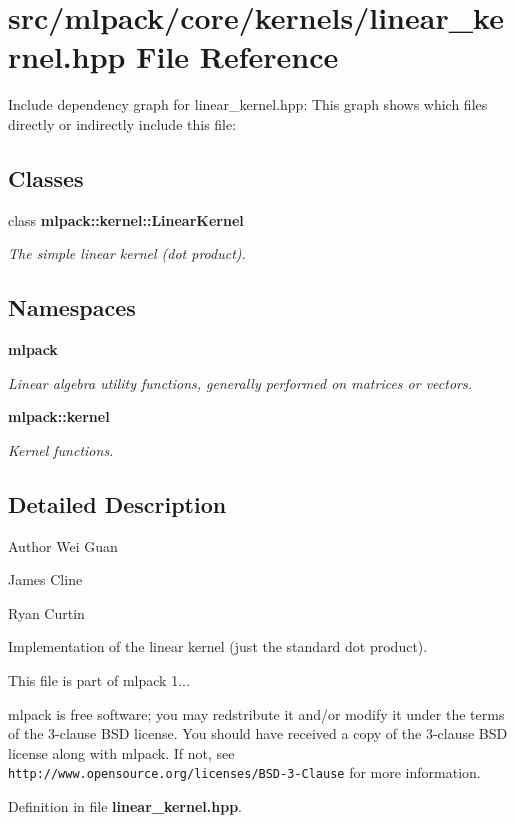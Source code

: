 \section{src/mlpack/core/kernels/linear\-\_\-kernel.hpp File Reference}
\label{linear__kernel_8hpp}
Include dependency graph for linear\-\_\-kernel.\-hpp\-:
This graph shows which files directly or indirectly include this file\-:
\subsection*{Classes}
\begin{DoxyCompactItemize}
\item 
class {\bf mlpack\-::kernel\-::\-Linear\-Kernel}
\begin{DoxyCompactList}\small\item\em The simple linear kernel (dot product). \end{DoxyCompactList}\end{DoxyCompactItemize}
\subsection*{Namespaces}
\begin{DoxyCompactItemize}
\item 
{\bf mlpack}
\begin{DoxyCompactList}\small\item\em Linear algebra utility functions, generally performed on matrices or vectors. \end{DoxyCompactList}\item 
{\bf mlpack\-::kernel}
\begin{DoxyCompactList}\small\item\em Kernel functions. \end{DoxyCompactList}\end{DoxyCompactItemize}


\subsection{Detailed Description}
\begin{DoxyAuthor}{Author}
Wei Guan 

James Cline 

Ryan Curtin
\end{DoxyAuthor}
Implementation of the linear kernel (just the standard dot product).

This file is part of mlpack 1...

mlpack is free software; you may redstribute it and/or modify it under the terms of the 3-\/clause B\-S\-D license. You should have received a copy of the 3-\/clause B\-S\-D license along with mlpack. If not, see {\tt http\-://www.\-opensource.\-org/licenses/\-B\-S\-D-\/3-\/\-Clause} for more information. 

Definition in file {\bf linear\-\_\-kernel.\-hpp}.

